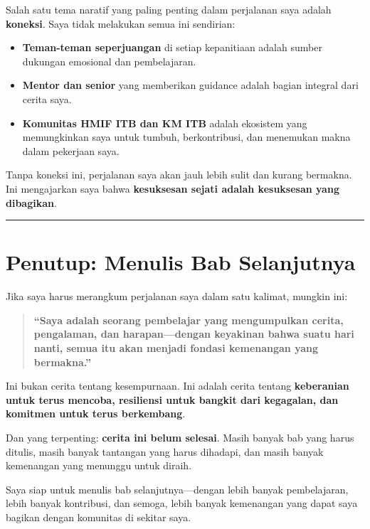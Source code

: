 \documentclass[
  letterpaper,
  DIV=11,
  numbers=noendperiod]{scrreprt}
\begin{document}
Salah satu tema naratif yang paling penting dalam perjalanan saya adalah
\textbf{koneksi}. Saya tidak melakukan semua ini sendirian:

\begin{itemize}
\item
  \textbf{Teman-teman seperjuangan} di setiap kepanitiaan adalah sumber
  dukungan emosional dan pembelajaran.
\item
  \textbf{Mentor dan senior} yang memberikan guidance adalah bagian
  integral dari cerita saya.
\item
  \textbf{Komunitas HMIF ITB dan KM ITB} adalah ekosistem yang
  memungkinkan saya untuk tumbuh, berkontribusi, dan menemukan makna
  dalam pekerjaan saya.
\end{itemize}

Tanpa koneksi ini, perjalanan saya akan jauh lebih sulit dan kurang
bermakna. Ini mengajarkan saya bahwa \textbf{kesuksesan sejati adalah
kesuksesan yang dibagikan}.

\begin{center}\rule{0.5\linewidth}{0.5pt}\end{center}

\section{\texorpdfstring{\textbf{Penutup: Menulis Bab
Selanjutnya}}{Penutup: Menulis Bab Selanjutnya}}\label{penutup-menulis-bab-selanjutnya}

Jika saya harus merangkum perjalanan saya dalam satu kalimat, mungkin
ini:

\begin{quote}
\textbf{``Saya adalah seorang pembelajar yang mengumpulkan cerita,
pengalaman, dan harapan---dengan keyakinan bahwa suatu hari nanti, semua
itu akan menjadi fondasi kemenangan yang bermakna.''}
\end{quote}

Ini bukan cerita tentang kesempurnaan. Ini adalah cerita tentang
\textbf{keberanian untuk terus mencoba, resiliensi untuk bangkit dari
kegagalan, dan komitmen untuk terus berkembang}.

Dan yang terpenting: \textbf{cerita ini belum selesai}. Masih banyak bab
yang harus ditulis, masih banyak tantangan yang harus dihadapi, dan
masih banyak kemenangan yang menunggu untuk diraih.

Saya siap untuk menulis bab selanjutnya---dengan lebih banyak
pembelajaran, lebih banyak kontribusi, dan semoga, lebih banyak
kemenangan yang dapat saya bagikan dengan komunitas di sekitar saya.
\end{document}
